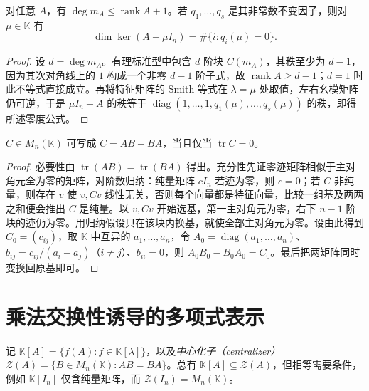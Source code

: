 \begin{proposition}
\label{prop:xie-ex-sim-rank-bounds}
对任意 $A$，有 $\deg m_A\leq\operatorname{rank}A+1$。若 $q_1,\ldots,q_s$ 是其非常数不变因子，则对 $\mu\in\mathbb K$ 有
\begin{equation}
 \dim\ker(A-\mu I_n)=\#\{i:q_i(\mu)=0\}.
 \label{eq:xie-ex-sim-geometric-invariant}
\end{equation}
\end{proposition}
\begin{proof}
设 $d=\deg m_A$。有理标准型中包含 $d$ 阶块 $C(m_A)$，其秩至少为 $d-1$，因为其次对角线上的 $1$ 构成一个非零 $d-1$ 阶子式，故 $\operatorname{rank}A\geq d-1$；$d=1$ 时此不等式直接成立。再将特征矩阵的 Smith 等式在 $\lambda=\mu$ 处取值，左右幺模矩阵仍可逆，于是 $\mu I_n-A$ 的秩等于 $\operatorname{diag}(1,\ldots,1,q_1(\mu),\ldots,q_s(\mu))$ 的秩，即得所述零度公式。
\end{proof}

\begin{proposition}[零迹与交换子]
\label{prop:xie-ex-sim-commutator}
$C\in M_n(\mathbb K)$ 可写成 $C=AB-BA$，当且仅当 $\operatorname{tr}C=0$。
\end{proposition}
\begin{proof}
必要性由 $\operatorname{tr}(AB)=\operatorname{tr}(BA)$ 得出。充分性先证零迹矩阵相似于主对角元全为零的矩阵，对阶数归纳：纯量矩阵 $cI_n$ 若迹为零，则 $c=0$；若 $C$ 非纯量，则存在 $v$ 使 $v,Cv$ 线性无关，否则每个向量都是特征向量，比较一组基及两两之和便会推出 $C$ 是纯量。以 $v,Cv$ 开始选基，第一主对角元为零，右下 $n-1$ 阶块的迹仍为零。用归纳假设只在该块内换基，就使全部主对角元为零。设由此得到 $C_0=(c_{ij})$，取 $\mathbb K$ 中互异的 $a_1,\ldots,a_n$，令 $A_0=\operatorname{diag}(a_1,\ldots,a_n)$、$b_{ij}=c_{ij}/(a_i-a_j)$（$i\ne j$）、$b_{ii}=0$，则 $A_0B_0-B_0A_0=C_0$。最后把两矩阵同时变换回原基即可。
\end{proof}

\section{乘法交换性诱导的多项式表示}
\label{sec:xie-ex-sim-centralizer}

记 $\mathbb K[A]=\{f(A):f\in\mathbb K[\lambda]\}$，以及\emph{中心化子（centralizer）} $\mathcal Z(A)=\{B\in M_n(\mathbb K):AB=BA\}$。总有 $\mathbb K[A]\subseteq\mathcal Z(A)$，但相等需要条件，例如 $\mathbb K[I_n]$ 仅含纯量矩阵，而 $\mathcal Z(I_n)=M_n(\mathbb K)$。

